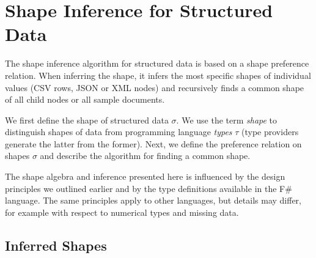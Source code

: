\documentclass[pldi-cameraready]{sigplanconf-pldi16}
\begin{document}
%
%

\section{Shape Inference for Structured Data}
\label{sec:inference}

The shape inference algorithm for structured data is based on a shape preference relation. When
inferring the shape, it infers the most specific shapes of individual values (CSV rows, JSON or XML
nodes) and recursively finds a common shape of all child nodes or all sample documents.

We first define the shape of structured data $\sigma$. We use the term \emph{shape} to distinguish
shapes of data from programming language \emph{types} $\tau$ (type providers generate the latter from the former).
Next, we define the preference relation on shapes $\sigma$ and describe the algorithm
for finding a common shape.

The shape algebra and inference presented here is influenced by the design principles
we outlined earlier and by the type definitions available in the F\# language.
The same principles apply to other languages, but details may differ, for example
with respect to numerical types and missing data.


\subsection{Inferred Shapes}
\label{sec:inference-types}
\end{document}

